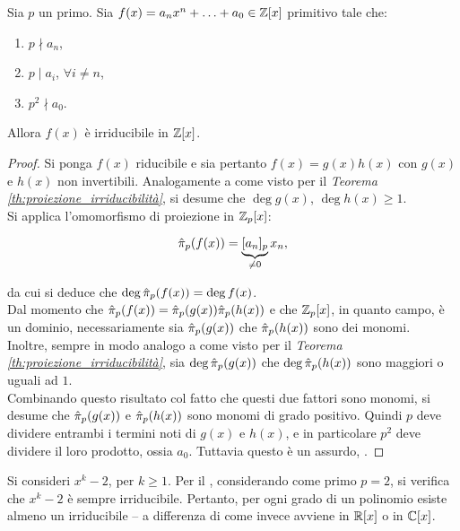 \documentclass[11pt]{scrbook}
\begin{document}
\begin{theorem}
    \label{th:eisenstein}
    Sia $p$ un primo.
    Sia $f(x) = a_n x^n + \ldots + a_0 \in \mathbb{Z}[x]$ primitivo tale che:

    \begin{enumerate}[ (1)]
        \item $p \nmid a_n$,
        \item $p \mid a_i$, $\forall i \neq n$,
        \item $p^2 \nmid a_0$.
    \end{enumerate}

    Allora $f(x)$ è irriducibile in $\mathbb{Z}[x]$.
\end{theorem}

\begin{proof}
    Si ponga $f(x)$ riducibile e sia pertanto $f(x)=g(x)h(x)$ con
    $g(x)$ e $h(x)$ non invertibili. Analogamente a come visto
    per il \textit{Teorema \ref{th:proiezione_irriducibilità}}, si
    desume che $\deg g(x)$, $\deg h(x) \geq 1$. \\

    Si applica l'omomorfismo di proiezione in $\mathbb{Z}_p[x]$:

    \[ \hat{\pi}_p(f(x))=\underbrace{[a_n]_p}_{\neq 0} x_n, \]

    da cui si deduce che $\deg \hat{\pi}_p(f(x)) = \deg f(x)$. \\

    Dal momento che $\hat{\pi}_p(f(x))=\hat{\pi}_p(g(x))\hat{\pi}_p(h(x))$ e
    che $\mathbb{Z}_p[x]$, in quanto campo, è un dominio,
    necessariamente sia $\hat{\pi}_p(g(x))$ che $\hat{\pi}_p(h(x))$
    sono dei monomi. \\

    Inoltre, sempre in modo analogo a come visto per il \textit{Teorema
        \ref{th:proiezione_irriducibilità}}, sia $\deg \hat{\pi}_p(g(x))$
    che $\deg \hat{\pi}_p(h(x))$ sono maggiori o uguali ad $1$. \\

    Combinando questo risultato col fatto che questi due fattori
    sono monomi, si desume che
    $\hat{\pi}_p(g(x))$ e $\hat{\pi}_p(h(x))$ sono monomi di grado positivo.
    Quindi $p$ deve dividere entrambi i termini noti di $g(x)$ e
    $h(x)$, e in particolare $p^2$ deve dividere il loro prodotto,
    ossia $a_0$. Tuttavia questo è un assurdo, \Lightning{}.
\end{proof}

\begin{remark*}
    Si consideri $x^k-2$, per $k \geq 1$.
    Per il ,
    considerando come primo $p=2$, si verifica che
    $x^k-2$ è sempre irriducibile. Pertanto, per ogni
    grado di un polinomio esiste almeno un irriducibile --
    a differenza di come invece avviene in $\mathbb{R}[x]$ o in $\mathbb{C}[x]$.
\end{remark*}
\end{document}
